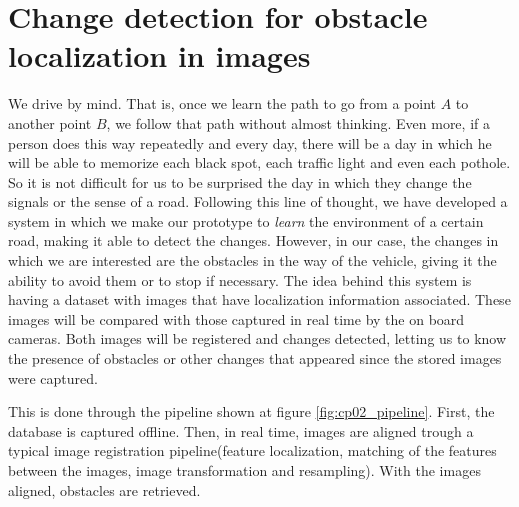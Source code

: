 
\graphicspath{{./images/chapter02/bmps/}{./images/chapter02/vects/}{./images/chapter02/}}

\chapter{Change detection for obstacle localization in images}\label{ch:chapter02}

We drive by mind. That is, once we learn the path to go from a point $A$ to another point $B$, we follow that path without almost thinking. Even more, if a person does this way repeatedly and every day, there will be a day in which he will be able to memorize each black spot, each traffic light and even each pothole. So it is not difficult for us to be surprised the day in which they change the signals or the sense of a road.
Following this line of thought, we have developed a system in which we make our prototype to \emph{learn} the environment of a certain road, making it able to detect the changes. However, in our case, the changes in which we are interested are the obstacles in the way of the vehicle, giving it the ability to avoid them or to stop if necessary. The idea behind this system is having a dataset with images that have localization information associated. These images will be compared with those captured in real time by the on board cameras. Both images will be registered and changes detected, letting us to know the presence of obstacles or other changes that appeared since the stored images were captured.

This is done through the pipeline shown at figure \ref{fig:cp02_pipeline}. First, the database is captured offline. Then, in real time, images are aligned trough a typical image registration pipeline(feature localization, matching of the features between the images, image transformation and resampling). With the images aligned,  obstacles are retrieved.

